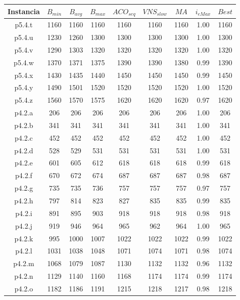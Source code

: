 \begin{table}
\begin{center}
\begin{tabular}{ |c|c|c|c|c|c|c|c|c| } 
\hline
Instancia & $B_{min}$ & $B_{avg}$ & $B_{max}$ & $ACO_{seq}$ & $VNS_{slow}$ & $MA$ & $i_{eMax}$ & $Best$ \\
\hline
p5.4.t & 1160 & 1160 & 1160 & 1160 & 1160 & 1160 & 1.00 & 1160  \\
p5.4.u & 1230 & 1260 & 1300 & 1300 & 1300 & 1300 & 1.00 & 1300  \\
p5.4.v & 1290 & 1303 & 1320 & 1320 & 1320 & 1320 & 1.00 & 1320  \\
p5.4.w & 1370 & 1371 & 1375 & 1390 & 1390 & 1380 & 0.99 & 1390  \\
p5.4.x & 1430 & 1435 & 1440 & 1450 & 1450 & 1450 & 0.99 & 1450  \\
p5.4.y & 1490 & 1501 & 1520 & 1520 & 1520 & 1520 & 1.00 & 1520  \\
p5.4.z & 1560 & 1570 & 1575 & 1620 & 1620 & 1620 & 0.97 & 1620  \\
p4.2.a & 206 & 206 & 206 & 206 & 206 & 206 & 1.00 & 206  \\
p4.2.b & 341 & 341 & 341 & 341 & 341 & 341 & 1.00 & 341  \\
p4.2.c & 452 & 452 & 452 & 452 & 452 & 452 & 1.00 & 452  \\
p4.2.d & 528 & 529 & 531 & 531 & 531 & 531 & 1.00 & 531  \\
p4.2.e & 601 & 605 & 612 & 618 & 618 & 618 & 0.99 & 618  \\
p4.2.f & 670 & 672 & 674 & 687 & 687 & 687 & 0.98 & 687  \\
p4.2.g & 735 & 735 & 736 & 757 & 757 & 757 & 0.97 & 757  \\
p4.2.h & 797 & 814 & 823 & 827 & 835 & 835 & 0.99 & 835  \\
p4.2.i & 891 & 895 & 903 & 918 & 918 & 918 & 0.98 & 918  \\
p4.2.j & 919 & 946 & 964 & 965 & 962 & 964 & 1.00 & 965  \\
p4.2.k & 995 & 1000 & 1007 & 1022 & 1022 & 1022 & 0.99 & 1022  \\
p4.2.l & 1031 & 1038 & 1048 & 1071 & 1074 & 1071 & 0.98 & 1074  \\
p4.2.m & 1068 & 1079 & 1087 & 1130 & 1132 & 1132 & 0.96 & 1132  \\
p4.2.n & 1129 & 1140 & 1160 & 1168 & 1174 & 1174 & 0.99 & 1174  \\
p4.2.o & 1182 & 1186 & 1191 & 1215 & 1218 & 1217 & 0.98 & 1218  \\

\end{tabular}
\end{center}
\end{table}
